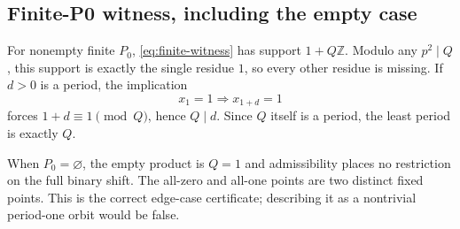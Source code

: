 \subsection{Finite-P0 witness, including the empty case}

For nonempty finite \(P_0\), \cref{eq:finite-witness} has support
\(1+Q\mathbb Z\).  Modulo any \(p^2\mid Q\), this support is exactly the
single residue \(1\), so every other residue is missing.  If \(d>0\) is a
period, the implication
\[
  x_1=1\Longrightarrow x_{1+d}=1
\]
forces \(1+d\equiv1\pmod Q\), hence \(Q\mid d\).  Since \(Q\) itself is a
period, the least period is exactly \(Q\).

When \(P_0=\varnothing\), the empty product is \(Q=1\) and admissibility
places no restriction on the full binary shift.  The all-zero and all-one
points are two distinct fixed points.  This is the correct edge-case
certificate; describing it as a nontrivial period-one orbit would be false.

